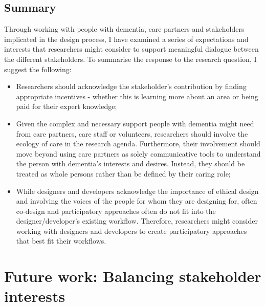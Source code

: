 \subsection{Summary}
\label{RQ3-summary}
Through working with people with dementia, care partners and stakeholders implicated in the design process, I have examined a series of expectations and interests that researchers might consider to support meaningful dialogue between the different stakeholders. To summarise the response to the research question, I  suggest the following:
\begin{itemize}
    \item Researchers should acknowledge the stakeholder's contribution by finding appropriate incentives - whether this is learning more about an area or being paid for their expert knowledge;
    \item Given the complex and necessary support people with dementia might need from care partners, care staff or volunteers, researchers should involve the ecology of care in the research agenda. Furthermore, their involvement should move beyond using care partners as solely communicative tools to understand the person with dementia's interests and desires. Instead, they should be treated as whole persons rather than be defined by their caring role;
    \item While designers and developers acknowledge the importance of ethical design and involving the voices of the people for whom they are designing for, often co-design and participatory approaches often do not fit into the designer/developer's existing workflow. Therefore, researchers might consider working with designers and developers to create participatory approaches that best fit their workflows.

\end{itemize}

\section{Future work: Balancing stakeholder interests}
\label{Discussion:Design}

